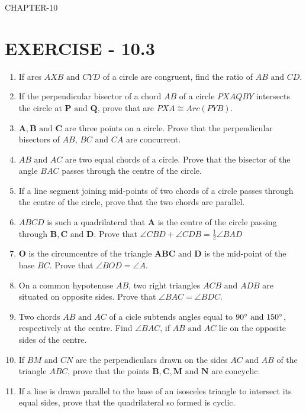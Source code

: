 \documentclass[12pt]{article}
\providecommand{\brak}[1]{\ensuremath{\left(#1\right)}}
\let\vec\mathbf
\begin{document}
\begin{center}
\textbf\large{CHAPTER-10}
\end{center}

\section{EXERCISE - 10.3}
\begin{enumerate}
\item If arcs ${AXB}\text{ and }{CYD}$ of a circle are congruent, find the ratio of ${AB}\text{ and }{CD}$.
\item If the perpendicular bisector of a chord ${AB}$ of a circle ${PXAQBY}$ intersects the circle at $\vec{P}\text{ and }\vec{Q}$, prove that arc ${PXA}\cong Arc\brak{PYB}$.
\item $\vec{A},\vec{B}\text{ and }\vec{C}$ are three points on a circle. Prove that the perpendicular bisectors of ${AB}$, ${BC}\text{ and }{CA}$ are concurrent.
\item ${AB}\text{ and }{AC}$ are two equal chords of a circle. Prove that the bisector of the angle ${BAC}$ passes through the centre of the circle.
\item If a line segment joining mid-points of two chords of a circle passes through the centre of the circle, prove that the two chords are parallel.
\item ${ABCD}$ is such a quadrilateral that $\vec{A}$ is the centre of the circle passing through $\vec{B},\vec{C}\text{ and }\vec{D}$. Prove that $\angle CBD+ \angle CDB = \frac{1}{2} \angle BAD$
\item $\vec{O}$ is the circumcentre of the triangle $\vec{ABC}\text{ and }\vec{D}$ is the mid-point of the base ${BC}$. Prove that $\angle BOD = \angle A$.
\item On a common hypotenuse ${AB}$, two right triangles ${ACB}\text{ and }{ADB}$ are situated on opposite sides. Prove that $\angle BAC = \angle BDC$.
\item Two chords ${AB}\text{ and }{AC}$ of a cicle subtends angles equal to $90\degree \text{ and }150\degree$, respectively at the centre. Find $\angle BAC$, if ${AB}\text{ and }{AC}$ lie on the opposite sides of the centre.
\item If ${BM}\text{ and }{CN}$ are the perpendiculars drawn on the sides ${AC}\text{ and }{AB}$ of the triangle ${ABC}$, prove that the points $\vec{B},\vec{C},\vec{M}\text{ and }\vec{N}$ are concyclic.
\item If a line is drawn parallel to the base of an isosceles triangle to intersect its equal sides, prove that the quadrilateral so formed is cyclic.

\end{enumerate}
\end{document}
